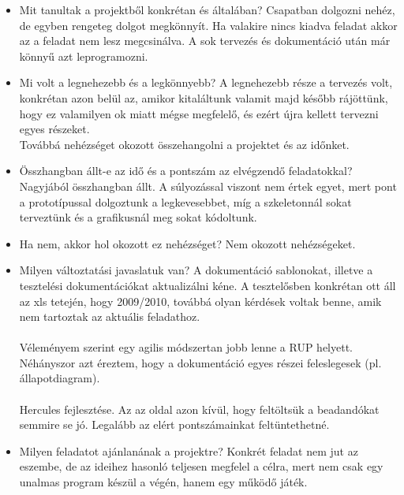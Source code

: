 \begin{itemize}
\item Mit tanultak a projektből konkrétan és általában? \newline
Csapatban dolgozni nehéz, de egyben rengeteg dolgot megkönnyít. Ha valakire nincs kiadva feladat akkor az a feladat nem lesz megcsinálva. 
A sok tervezés és dokumentáció után már könnyű azt leprogramozni.
\item Mi volt a legnehezebb és a legkönnyebb? \newline
A legnehezebb része a tervezés volt, konkrétan azon belül az, amikor kitaláltunk valamit majd később rájöttünk, hogy ez valamilyen ok miatt mégse megfelelő, és ezért újra kellett tervezni egyes részeket.\\
Továbbá nehézséget okozott összehangolni a projektet és az időnket.
\item Összhangban állt-e az idő és a pontszám az elvégzendő feladatokkal? \newline
Nagyjából összhangban állt. A súlyozással viszont nem értek egyet, mert pont a prototípussal dolgoztunk a legkevesebbet, míg a szkeletonnál sokat terveztünk és a grafikusnál meg sokat kódoltunk.\\
\item Ha nem, akkor hol okozott ez nehézséget? \newline
Nem okozott nehézségeket.
\item Milyen változtatási javaslatuk van? \newline
A dokumentáció sablonokat, illetve a tesztelési dokumentációkat aktualizálni kéne. A tesztelősben konkrétan ott áll az xls tetején, hogy 2009/2010, továbbá olyan kérdések voltak benne, amik nem tartoztak az aktuális feladathoz.\\\\
Véleményem szerint egy agilis módszertan jobb lenne a RUP helyett. Néhányszor azt éreztem, hogy a dokumentáció egyes részei feleslegesek (pl. állapotdiagram).\\\\
Hercules fejlesztése. Az az oldal azon kívül, hogy feltöltsük a beadandókat semmire se jó. Legalább az elért pontszámainkat feltüntethetné.
\item Milyen feladatot ajánlanának a projektre? \newline
Konkrét feladat nem jut az eszembe, de az ideihez hasonló teljesen megfelel a célra, mert nem csak egy unalmas program készül a végén, hanem egy működő játék.

\end{itemize}


